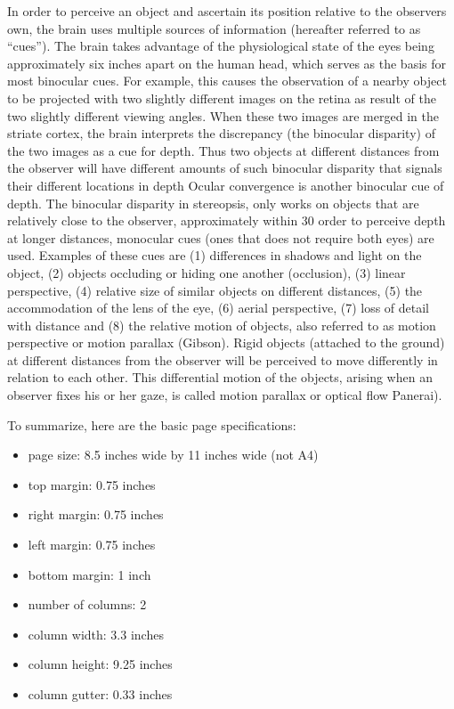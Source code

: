 \documentclass[tog]{acmsiggraph}
\begin{document}
In order to perceive an object and ascertain its position relative to the observers own, the brain uses multiple sources of information (hereafter referred to as “cues”). 
The brain takes advantage of the physiological state of the eyes being approximately six inches
apart on the human head, which serves as the basis for most binocular cues. For example, this
causes the observation of a nearby object to be projected with two slightly different images on the retina as result of the two slightly different viewing angles. When these two images are merged in the striate cortex, the brain interprets the discrepancy (the binocular disparity) of the two images as a cue for depth. Thus two objects at different distances from the observer will have different amounts of such binocular disparity that signals their different locations in depth 
Ocular convergence is another binocular cue of depth. The binocular disparity in stereopsis, only works on objects that are relatively close to the observer,
approximately within 30 
order to perceive depth at longer distances, monocular cues (ones that does not require
both eyes) are used. Examples of these cues are (1) differences in shadows and
light on the object, (2) objects occluding or hiding one another (occlusion), (3)
linear perspective, (4) relative size of similar objects on different distances, (5) the
accommodation of the lens of the eye, (6) aerial perspective, (7) loss of detail with
distance and (8) the relative motion of objects, also referred to as motion
perspective or motion parallax (Gibson). Rigid objects (attached to the ground) at
different distances from the observer will be perceived to move differently in
relation to each other. This differential motion of the objects, arising when an
observer fixes his or her gaze, is called motion parallax or optical flow 
Panerai).


To summarize, here are the basic page specifications: 
\begin{itemize}
\item page size: 8.5 inches wide by 11 inches wide (not A4)
\item top margin: 0.75 inches
\item right margin: 0.75 inches
\item left margin: 0.75 inches
\item bottom margin: 1 inch
\item number of columns: 2
\item column width: 3.3 inches
\item column height: 9.25 inches
\item column gutter: 0.33 inches
\end{itemize}
\end{document}
